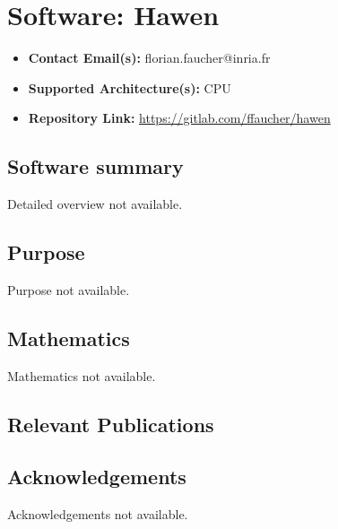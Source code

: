 \section{Software: Hawen}
\label{sec:Hawen:software}



\begin{itemize}
    \item \textbf{Contact Email(s):} florian.faucher@inria.fr
    \item \textbf{Supported Architecture(s):} CPU
    \item \textbf{Repository Link:} \href{https://gitlab.com/ffaucher/hawen}{https://gitlab.com/ffaucher/hawen}
\end{itemize}

\subsection{Software summary}
\label{sec:Hawen:summary}
Detailed overview not available.



\subsection{Purpose}
\label{sec:Hawen:purpose}
Purpose not available.



\subsection{Mathematics}
\label{sec:Hawen:mathematics}
Mathematics not available.


\subsection{Relevant Publications}
\label{sec:Hawen:publications}

\subsection{Acknowledgements}
\label{sec::Hawen:acknowledgements}

Acknowledgements not available.


